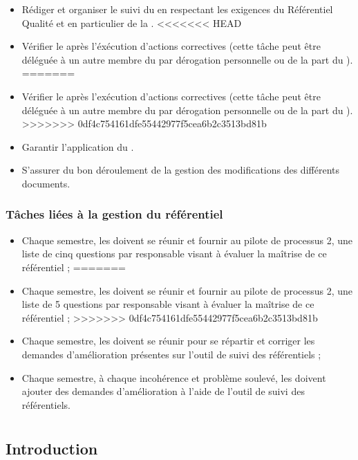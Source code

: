 \begin{itemize}
	\item Rédiger et organiser le suivi du \PGCCourt{} en respectant les exigences du Référentiel Qualité et en particulier de la \DGQDEUXCourt.
<<<<<<< HEAD
	\item Vérifier le \PGCCourt après l’éxécution d’actions correctives (cette tâche peut être déléguée à un autre membre du \PICCourt par dérogation personnelle ou de la part du \CP).
=======
	\item Vérifier le \PGCCourt{} après l’exécution d’actions correctives (cette tâche peut être déléguée à un autre membre du \PICCourt{} par dérogation personnelle ou de la part du \CP).
>>>>>>> 0df4c754161dfe55442977f5cea6b2c3513bd81b
	\item Garantir l’application du \PGCCourt.
	\item S’assurer du bon déroulement de la gestion des modifications des différents documents.
\end{itemize}

\subsubsection*{Tâches liées à la gestion du référentiel}

\begin{itemize}
<<<<<<< HEAD
	\item Chaque semestre, les \RQs{} doivent se réunir et fournir au pilote de processus 2, une liste de cinq questions par responsable visant à évaluer la maîtrise de ce référentiel ;
=======
	\item Chaque semestre, les \RQs{} doivent se réunir et fournir au pilote de processus 2, une liste de 5 questions par responsable visant à évaluer la maîtrise de ce référentiel ;
>>>>>>> 0df4c754161dfe55442977f5cea6b2c3513bd81b
	\item Chaque semestre, les \RQs{} doivent se réunir pour se répartir et corriger les demandes d’amélioration présentes sur l’outil de suivi des référentiels ;
	\item Chaque semestre, à chaque incohérence et problème soulevé, les \RQs{} doivent ajouter des demandes d’amélioration à l’aide de l’outil de suivi des référentiels.
\end{itemize}

\newpage
\section{\RQA}
\subsection*{Introduction}

